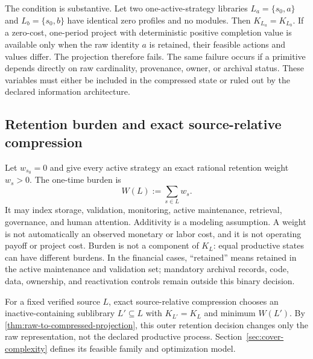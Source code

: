 The condition is substantive. Let two one-active-strategy libraries
\(L_a=\{s_0,a\}\) and \(L_b=\{s_0,b\}\) have identical zero profiles and no
modules. Then \(K_{L_a}=K_{L_b}\). If a zero-cost, one-period project with
deterministic positive completion value is available only when the raw identity
\(a\) is retained, their feasible actions and values differ. The projection
therefore fails. The same failure occurs if a primitive depends directly on
raw cardinality, provenance, owner, or archival status. These variables must
either be included in the compressed state or ruled out by the declared
information architecture.

\subsection{Retention burden and exact source-relative compression}

Let \(w_{s_0}=0\) and give every active strategy an exact rational retention
weight \(w_s>0\).  The one-time burden is
\begin{equation}
  W(L):=\sum_{s\in L}w_s.
  \label{eq:library-burden}
\end{equation}
It may index storage, validation, monitoring, active maintenance, retrieval,
governance, and human attention. Additivity is a modeling assumption. A weight
is not automatically an observed monetary or labor cost, and it is not
operating payoff or project cost. Burden is not a component of \(K_L\): equal
productive states can have different burdens. In the financial cases,
``retained'' means retained in the active maintenance and validation set;
mandatory archival records, code, data, ownership, and reactivation controls
remain outside this binary decision.

For a fixed verified source \(L\), exact source-relative compression chooses
an inactive-containing sublibrary \(L'\subseteq L\) with
\(K_{L'}=K_L\) and minimum \(W(L')\).  By
\cref{thm:raw-to-compressed-projection}, this outer retention decision changes
only the raw representation, not the declared productive process.  Section~\ref{sec:cover-complexity}
defines its feasible family and optimization model.
